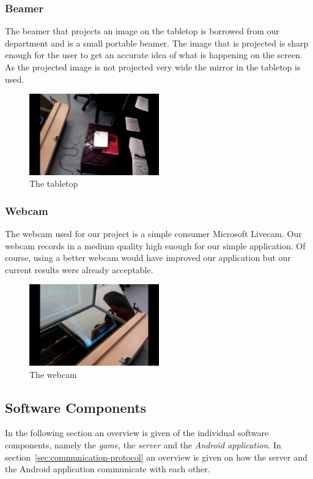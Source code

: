 \documentclass[a4paper,10pt]{article}
\begin{document}
\subsubsection{Beamer}
The beamer that projects an image on the tabletop is borrowed from our department and is a small portable beamer.
The image that is projected is sharp enough for the user to get an accurate idea of what is happening on the screen. 
As the projected image is not projected very wide the mirror in the tabletop is used. 

\begin{figure}[h!]
\caption{The tabletop}
\centering
\includegraphics[width=0.5\textwidth]{images/beamer}
\end{figure}

\subsubsection{Webcam}
The webcam used for our project is a simple consumer Microsoft Livecam. 
Our webcam records in a medium quality high enough for our simple application. 
Of course, using a better webcam would have improved our application but our current results were already acceptable. 

\begin{figure}[h!]
\caption{The webcam}
\centering
\includegraphics[width=0.5\textwidth]{images/webcam}
\end{figure}

\subsection{Software Components}
\label{sec:software-components}
In the following section an overview is given of the individual software components, namely the \emph{game}, the \emph{server} and the \emph{Android application}.
In section~\ref{sec:communication-protocol} an overview is given on how the server and the Android application communicate with each other.
\end{document}
